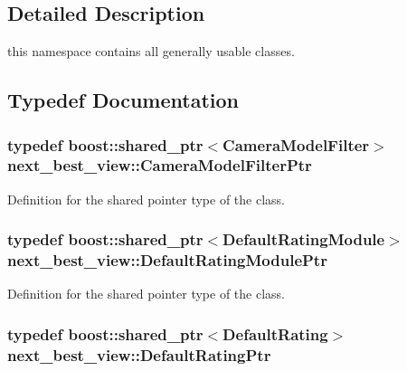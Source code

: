 \subsection{\-Detailed \-Description}
this namespace contains all generally usable classes. 

\subsection{\-Typedef \-Documentation}
\hypertarget{namespacenext__best__view_a75c548145a1fdcdc491efbda66e9f440}{
\subsubsection[{\-Camera\-Model\-Filter\-Ptr}]{\setlength{\rightskip}{0pt plus 5cm}typedef boost\-::shared\-\_\-ptr$<${\bf \-Camera\-Model\-Filter}$>$ {\bf next\-\_\-best\-\_\-view\-::\-Camera\-Model\-Filter\-Ptr}}}\label{namespacenext__best__view_a75c548145a1fdcdc491efbda66e9f440}


\-Definition for the shared pointer type of the class. 

\hypertarget{namespacenext__best__view_abb8767435c6611d0d51d80da6bcd01ae}{
\subsubsection[{\-Default\-Rating\-Module\-Ptr}]{\setlength{\rightskip}{0pt plus 5cm}typedef boost\-::shared\-\_\-ptr$<${\bf \-Default\-Rating\-Module}$>$ {\bf next\-\_\-best\-\_\-view\-::\-Default\-Rating\-Module\-Ptr}}}\label{namespacenext__best__view_abb8767435c6611d0d51d80da6bcd01ae}


\-Definition for the shared pointer type of the class. 

\hypertarget{namespacenext__best__view_a91ab4012a2b5a5b1eb58d852de7c87dc}{
\subsubsection[{\-Default\-Rating\-Ptr}]{\setlength{\rightskip}{0pt plus 5cm}typedef boost\-::shared\-\_\-ptr$<${\bf \-Default\-Rating}$>$ {\bf next\-\_\-best\-\_\-view\-::\-Default\-Rating\-Ptr}}}\label{namespacenext__best__view_a91ab4012a2b5a5b1eb58d852de7c87dc}


